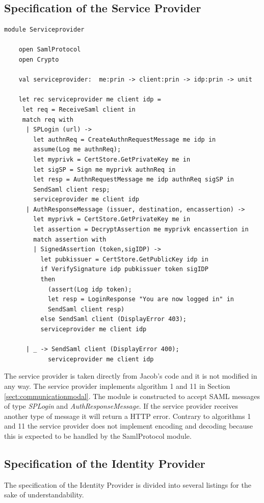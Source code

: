 \documentclass[twosided]{report}
\begin{document}
\subsection{Specification of the Service Provider}
\begin{lstlisting}[style=fstar, caption={Specification of service provider}]
	module Serviceprovider
	
	open SamlProtocol
	open Crypto
	
	val serviceprovider:  me:prin -> client:prin -> idp:prin -> unit
	
	let rec serviceprovider me client idp = 
	 let req = ReceiveSaml client in
	 match req with
	  | SPLogin (url) ->
	    let authnReq = CreateAuthnRequestMessage me idp in
	    assume(Log me authnReq);
	    let myprivk = CertStore.GetPrivateKey me in
	    let sigSP = Sign me myprivk authnReq in
	    let resp = AuthnRequestMessage me idp authnReq sigSP in 
	    SendSaml client resp;
	    serviceprovider me client idp
	  | AuthResponseMessage (issuer, destination, encassertion) -> 
	    let myprivk = CertStore.GetPrivateKey me in
	    let assertion = DecryptAssertion me myprivk encassertion in
	    match assertion with
	    | SignedAssertion (token,sigIDP) ->
	      let pubkissuer = CertStore.GetPublicKey idp in
	      if VerifySignature idp pubkissuer token sigIDP
	      then
	        (assert(Log idp token);
	        let resp = LoginResponse "You are now logged in" in
	        SendSaml client resp)
	      else SendSaml client (DisplayError 403);
	      serviceprovider me client idp
	  
	  | _ -> SendSaml client (DisplayError 400);
	        serviceprovider me client idp
\end{lstlisting}

The service provider is taken directly from Jacob's code and it is not modified in any way. The service provider implements algorithm 1 and 11 in Section \ref{sect:communicationmodal}. The module is constructed to accept SAML messages of type \emph{SPLogin} and \emph{AuthResponseMessage}. If the service provider receives another type of message it will return a HTTP error. Contrary to algorithms 1 and 11 the service provider does not implement encoding and decoding because this is expected to be handled by the SamlProtocol module.

\clearpage
\subsection{Specification of the Identity Provider}
The specification of the Identity Provider is divided into several listings for the sake of understandability.
\end{document}
